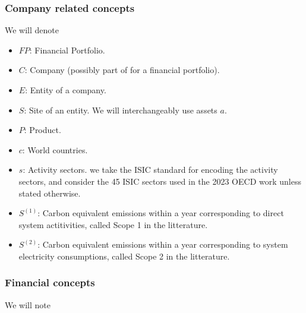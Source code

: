 \subsubsection{Company related concepts}

We will denote
\begin{itemize}
\item[•] $FP$: Financial Portfolio.
\item[•] $C$: Company (possibly part of for a financial portfolio).
\item[•] $E$: Entity of a company.
\item[•] $S$: Site of an entity. We will interchangeably use assets $a$.
\item[•] $P$: Product.
\item[•] $c$: World countries.
\item[•] $s$: Activity sectors. we take the ISIC standard \cite{ISIC} for encoding the activity sectors, and consider the 45 ISIC sectors used in the 2023 OECD work \cite{OECD1}\cite{OECD2} unless stated otherwise.
\item[•] $S^{(1)}$: Carbon equivalent emissions  within a year corresponding to direct system actitivities, called Scope 1 \cite{S1} in the litterature.
\item[•] $S^{(2)}$: Carbon equivalent emissions within a year corresponding to system electricity consumptions, called Scope 2 \cite{S2} in the litterature.
\end{itemize}


\subsubsection{Financial concepts}

We will note

